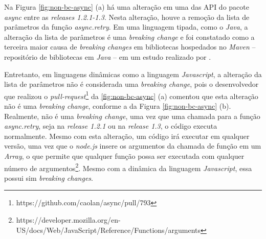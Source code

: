 Na Figura \ref{fig:non-bc-async} (a) há uma alteração em uma das \gls{API} do pacote \textit{async} entre as \textit{releases 1.2.1-1.3}. Nesta alteração, houve a remoção da lista de parâmetros da função \textit{async.retry}. Em uma linguagem tipada, como o \textit{Java}, a alteração da lista de parâmetros é uma \textit{breaking change} e foi constatado como a terceira maior causa de \textit{breaking changes} em bibliotecas hospedados no \textit{Maven} -- repositório de bibliotecas em \textit{Java} -- em um estudo realizado por .

Entretanto, em linguagens dinâmicas como a linguagem \textit{Javascript}, a alteração da lista de parâmetros não é considerada uma \textit{breaking change}, pois o desenvolvedor que realizou o \textit{pull-request}\footnote{https://github.com/caolan/async/pull/793} da \ref{fig:non-bc-async} (a) comentou que esta alteração não é uma \textit{breaking change}, conforme a da Figura \ref{fig:non-bc-async} (b). Realmente, não é uma \textit{breaking change}, uma vez que uma chamada para a função \textit{async.retry}, seja na \textit{release 1.2.1} ou na \textit{release 1.3}, o código executa normalmente. Mesmo com esta alteração, um código irá executar em qualquer versão, uma vez que o \textit{node.js} insere os argumentos da chamada de função em um \textit{Array}, o que permite que qualquer função possa ser executada com qualquer número de argumentos\footnote{https://developer.mozilla.org/en-US/docs/Web/JavaScript/Reference/Functions/arguments}. Mesmo com a dinâmica da linguagem \textit{Javascript}, essa possui sim \textit{breaking changes}.